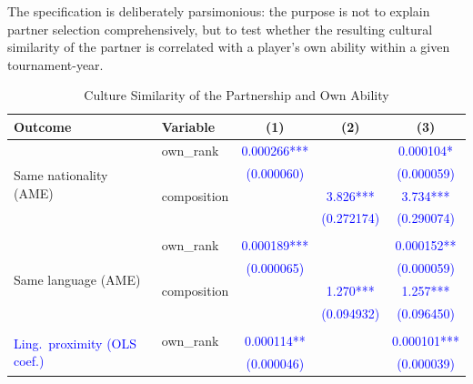 \documentclass[10pt]{article}
\begin{document}
 The specification is deliberately parsimonious: the purpose is not to explain partner selection comprehensively, but to test whether the resulting cultural similarity of the partner is correlated with a player's own ability within a given tournament-year.






\begin{table}[htbp]
\color{red}
\centering
\caption{Culture Similarity of the Partnership and Own Ability \label{tab:t9}}
\begin{threeparttable}
\begin{tabular}{llccc}
\toprule
Outcome & Variable & (1) & (2) & (3) \\
\midrule
\multirow{4}{*}{Same nationality (AME)}
 & own\_rank & \textcolor{blue}{0.000266***} & & \textcolor{blue}{0.000104*} \\
 & & \textcolor{blue}{(0.000060)} & & \textcolor{blue}{(0.000059)} \\
 & composition & & \textcolor{blue}{3.826***} & \textcolor{blue}{3.734***} \\
 & & & \textcolor{blue}{(0.272174)} & \textcolor{blue}{(0.290074)} \\
\addlinespace
\midrule\\
\multirow{4}{*}{Same language (AME)}
 & own\_rank & \textcolor{blue}{0.000189***} & & \textcolor{blue}{0.000152**} \\
 & & \textcolor{blue}{(0.000065)} & & \textcolor{blue}{(0.000059)} \\
 & composition & & \textcolor{blue}{1.270***} & \textcolor{blue}{1.257***} \\
 & & & \textcolor{blue}{(0.094932)} & \textcolor{blue}{(0.096450)} \\
\addlinespace
\midrule\\
\multirow{4}{*}{\textcolor{blue}{Ling.\ proximity (OLS coef.)}}
 & own\_rank & \textcolor{blue}{0.000114**} & & \textcolor{blue}{0.000101***} \\
 & & \textcolor{blue}{(0.000046)} & & \textcolor{blue}{(0.000039)} \\

\end{tabular}
\end{threeparttable}
\end{table}
\end{document}
